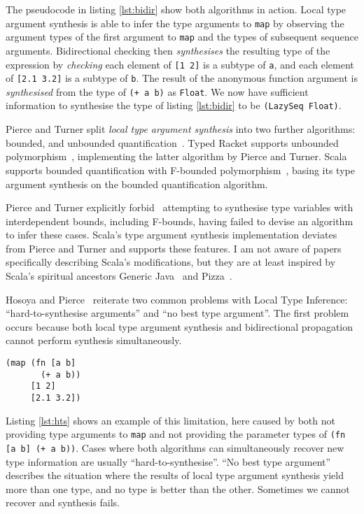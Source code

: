 The pseudocode in listing \ref{lst:bidir} show both algorithms in action. Local type argument synthesis is able
to infer the type arguments to \lstinline|map| by observing the argument types of the first
argument to \lstinline|map| and the types of subsequent sequence arguments. Bidirectional checking
then \emph{synthesises} the resulting type of the expression by \emph{checking} each element
of \lstinline|[1 2]| is a subtype of \lstinline|a|, and each element of \lstinline|[2.1 3.2]| is a subtype of
\lstinline|b|. The result of the anonymous function argument is \emph{synthesised} from the type of
\lstinline|(+ a b)| as \lstinline|Float|. We now have sufficient information to 
synthesise the type of listing \ref{lst:bidir} to be \lstinline|(LazySeq Float)|.

Pierce and Turner split \emph{local type argument synthesis} into two further
algorithms: bounded, and unbounded quantification~\cite{PT00}. 
Typed Racket 
supports unbounded polymorphism~\cite{Tob10}, implementing the latter algorithm by Pierce and Turner.
Scala supports bounded quantification with F-bounded polymorphism~\cite{CCHOM89},
basing its type argument synthesis on the bounded quantification algorithm.

Pierce and Turner explicitly forbid~\cite{PT00}
attempting to synthesise type variables with interdependent bounds, including
F-bounds, having failed to devise an algorithm to infer these cases.
Scala's type argument synthesis implementation deviates from Pierce and Turner and supports these features.
I am not aware of papers specifically describing Scala's modifications, but they are at least inspired by
Scala's spiritual ancestors Generic Java~\cite{BOSW98} and Pizza~\cite{OW97}.

Hosoya and Pierce~\cite{HP99} reiterate two common problems with Local Type Inference:
``hard-to-synthesise arguments'' and ``no best type argument''. The first problem occurs because
both local type argument synthesis and bidirectional propagation cannot perform synthesis
simultaneously. 

\begin{lstlisting}[caption=Hard-to-synthesise expression, label=lst:hts]
(map (fn [a b] 
       (+ a b)) 
     [1 2] 
     [2.1 3.2])
\end{lstlisting}

Listing \ref{lst:hts} shows an example of this limitation,
here caused by both not providing type arguments to \lstinline|map| and not providing the parameter types of \lstinline|(fn [a b] (+ a b))|.
 Cases where both algorithms can simultaneously recover new type information are usually ``hard-to-synthesise''.
``No best type argument'' describes the situation where the results of local
type argument synthesis yield more than one type, and no type is better than the other. Sometimes we cannot recover and synthesis
fails.

